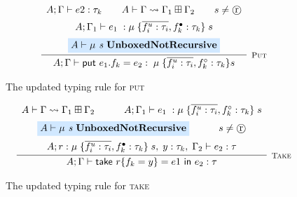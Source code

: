 \begin{figure}
    \centering
    \begin{align*}
        \infer[\textsc{\footnotesize{Put}}]{
            A;\Gamma \vdash \textsf{put } e_1.f_k  = e_2 : \; \mu \; \{ \overline{f_i^u : \tau_i}, f_k^\circ : \tau_k \} s
        }{
            \begin{array}{c}
                A;\Gamma \vdash e2 : \tau_k
                \hspace{2em}
                A \vdash \Gamma \rightsquigarrow \Gamma_1 \boxplus \Gamma_2
                \hspace{2em}
                s \neq \text{\textcircled{r}}
                \vspace{0.5em} \\
                A;\Gamma_1 \vdash e_1\; : \mu\; \{ \overline{f_i^u : \tau_i}, f_k^\bullet : \tau_k \}\; s
                \vspace{0.5em} \\
                \colorbox{highlighteq}{$A \vdash \mu \textit{ s } \textbf{UnboxedNotRecursive}$}
            \end{array}
        }
    \end{align*}
    
    \caption{The updated typing rule for \textsc{put}}
    \label{fig:puttypingrule}
\end{figure}

\begin{figure}
    \centering
    \begin{align*}
        \infer[\textsc{\footnotesize{Take}}]{
            A;\Gamma \vdash \textsf{take } r \{ f_k = y \} = e1 \textsf{ in } e_2 : \tau
        }{
            \begin{array}{c}
                A \vdash \Gamma \rightsquigarrow \Gamma_1 \boxplus \Gamma_2
                \hspace{3em}
                A;\Gamma_1 \vdash e_1\; : \mu\; \{ \overline{f_i^u : \tau_i}, f_k^\circ : \tau_k \}\; s
                \vspace{0.5em} \\
                \colorbox{highlighteq}{$A \vdash \mu \textit{ s } \textbf{UnboxedNotRecursive}$}
                \hspace{3em}
                s \neq \text{\textcircled{r}}
                \vspace{0.5em} \\
                A; r : \mu\; \{ \overline{f_i^u : \tau_i}, f_k^\bullet : \tau_k \}\; s
                ,\; y : \tau_k,\; \Gamma_2 \vdash e_2 : \tau
            \end{array}
        }
    \end{align*}
    
    \caption{The updated typing rule for \textsc{take}}
    \label{fig:taketypingrule}
\end{figure}

